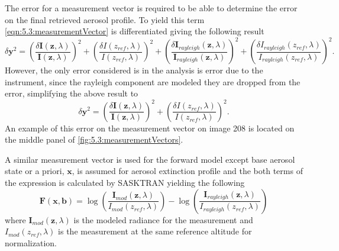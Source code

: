 The error for a measurement vector is required to be able to determine the error on the final retrieved aerosol profile. To yield this term \autoref{eqn:5.3:measurementVector} is differentiated giving the following result
\begin{equation}
    \delta\mathbf{y}^{2} = \left(\frac{\delta\mathbf{I}(\mathbf{z},\lambda)}{\mathbf{I}(\mathbf{z},\lambda)}\right)^{2} + \left(\frac{\delta I(z_{ref},\lambda)}{I(z_{ref},\lambda)}\right)^{2} + \left(\frac{\delta\mathbf{I}_{rayleigh}(\mathbf{z},\lambda)}{\mathbf{I}_{rayleigh}(\mathbf{z},\lambda)}\right)^{2} + \left(\frac{\delta I_{rayleigh}(z_{ref},\lambda)}{I_{rayleigh}(z_{ref},\lambda)}\right)^{2}.
\end{equation}
However, the only error considered is in the analysis is error due to the instrument, since the rayleigh component are modeled they are dropped from the error, simplifying the above result to
\begin{equation}
    \delta\mathbf{y}^{2} = \left(\frac{\delta\mathbf{I}(\mathbf{z},\lambda)}{\mathbf{I}(\mathbf{z},\lambda)}\right)^{2} + \left(\frac{\delta I(z_{ref},\lambda)}{I(z_{ref},\lambda)}\right)^{2}.
\end{equation}
An example of this error on the measurement vector on image 208 is located on the middle panel of \autoref{fig:5.3:measurementVectors}.

A similar measurement vector is used for the forward model except base aerosol state or a priori, $\mathbf{x}$, is assumed for aerosol extinction profile and the both terms of the expression is calculated by SASKTRAN yielding the following
\begin{equation}
    \mathbf{F}(\mathbf{x},\mathbf{b}) = \log\left(\frac{\mathbf{I}_{mod}(\mathbf{z},\lambda)}{I_{mod}(z_{ref},\lambda)}\right)-\log\left(\frac{\mathbf{I}_{rayleigh}(\mathbf{z},\lambda)}{I_{rayleigh}(z_{ref},\lambda)}\right)
    \label{eqn:5.3:forwardModel}
\end{equation}
where $\mathbf{I}_{mod}(\mathbf{z},\lambda)$ is the modeled radiance for the measurement and $I_{mod}(z_{ref},\lambda)$ is the measurement at the same reference altitude for normalization.

